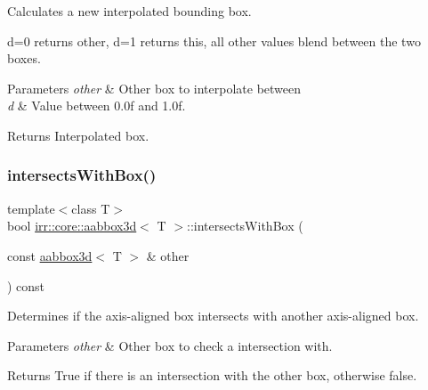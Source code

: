 Calculates a new interpolated bounding box. 

d=0 returns other, d=1 returns this, all other values blend between the two boxes. 
\begin{DoxyParams}{Parameters}
{\em other} & Other box to interpolate between \\
\hline
{\em d} & Value between 0.\+0f and 1.\+0f. \\
\hline
\end{DoxyParams}
\begin{DoxyReturn}{Returns}
Interpolated box. 
\end{DoxyReturn}
\mbox{\label{classirr_1_1core_1_1aabbox3d_a7210d8759855896ba4919a800ad69bbc}} 
\subsubsection{\texorpdfstring{intersects\+With\+Box()}{intersectsWithBox()}}
{\footnotesize\ttfamily template$<$class T$>$ \\
bool \hyperlink{classirr_1_1core_1_1aabbox3d}{irr\+::core\+::aabbox3d}$<$ T $>$\+::intersects\+With\+Box (\begin{DoxyParamCaption}\item[{const \hyperlink{classirr_1_1core_1_1aabbox3d}{aabbox3d}$<$ T $>$ \&}]{other }\end{DoxyParamCaption}) const\hspace{0.3cm}{\ttfamily [inline]}}



Determines if the axis-\/aligned box intersects with another axis-\/aligned box. 


\begin{DoxyParams}{Parameters}
{\em other} & Other box to check a intersection with. \\
\hline
\end{DoxyParams}
\begin{DoxyReturn}{Returns}
True if there is an intersection with the other box, otherwise false. 
\end{DoxyReturn}
\mbox{\label{classirr_1_1core_1_1aabbox3d_ad0d7fec0145329dfca538066298fa3f2}} 
